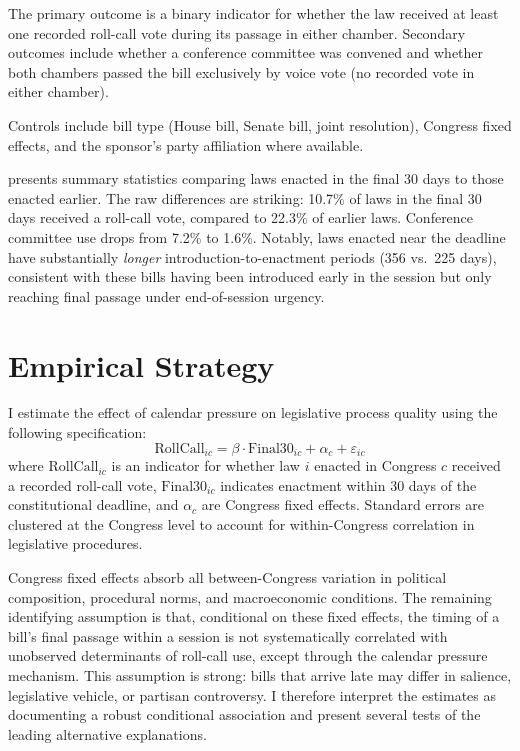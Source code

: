 \documentclass[12pt]{article}
\begin{document}
The primary outcome is a binary indicator for whether the law received at least one recorded roll-call vote during its passage in either chamber. Secondary outcomes include whether a conference committee was convened and whether both chambers passed the bill exclusively by voice vote (no recorded vote in either chamber).

Controls include bill type (House bill, Senate bill, joint resolution), Congress fixed effects, and the sponsor's party affiliation where available.



 presents summary statistics comparing laws enacted in the final 30 days to those enacted earlier. The raw differences are striking: 10.7\% of laws in the final 30 days received a roll-call vote, compared to 22.3\% of earlier laws. Conference committee use drops from 7.2\% to 1.6\%. Notably, laws enacted near the deadline have substantially \textit{longer} introduction-to-enactment periods (356 vs.\ 225 days), consistent with these bills having been introduced early in the session but only reaching final passage under end-of-session urgency.


\section{Empirical Strategy}

I estimate the effect of calendar pressure on legislative process quality using the following specification:
\begin{equation}\label{eq:main}
\text{RollCall}_{ic} = \beta \cdot \text{Final30}_{ic} + \alpha_c + \varepsilon_{ic}
\end{equation}
where $\text{RollCall}_{ic}$ is an indicator for whether law $i$ enacted in Congress $c$ received a recorded roll-call vote, $\text{Final30}_{ic}$ indicates enactment within 30 days of the constitutional deadline, and $\alpha_c$ are Congress fixed effects. Standard errors are clustered at the Congress level to account for within-Congress correlation in legislative procedures.

Congress fixed effects absorb all between-Congress variation in political composition, procedural norms, and macroeconomic conditions. The remaining identifying assumption is that, conditional on these fixed effects, the timing of a bill's final passage within a session is not systematically correlated with unobserved determinants of roll-call use, except through the calendar pressure mechanism. This assumption is strong: bills that arrive late may differ in salience, legislative vehicle, or partisan controversy. I therefore interpret the estimates as documenting a robust conditional association and present several tests of the leading alternative explanations.
\end{document}
